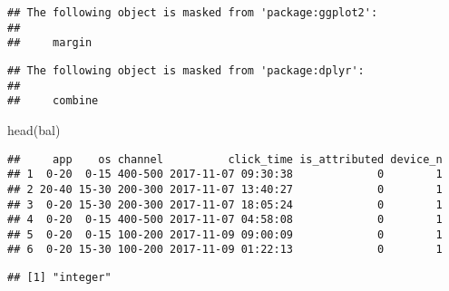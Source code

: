 \documentclass[
]{article}
\newenvironment{Shaded}{\begin{snugshade}}{\end{snugshade}}
\newcommand{\FunctionTok}[1]{\textcolor[rgb]{0.00,0.00,0.00}{#1}}
\newcommand{\NormalTok}[1]{#1}
\newcommand{\SpecialCharTok}[1]{\textcolor[rgb]{0.00,0.00,0.00}{#1}}
\begin{document}
\begin{verbatim}
## The following object is masked from 'package:ggplot2':
## 
##     margin
\end{verbatim}

\begin{verbatim}
## The following object is masked from 'package:dplyr':
## 
##     combine
\end{verbatim}

\begin{Shaded}
\begin{Highlighting}[]
\FunctionTok{head}\NormalTok{(bal)}
\end{Highlighting}
\end{Shaded}

\begin{verbatim}
##     app    os channel          click_time is_attributed device_n
## 1  0-20  0-15 400-500 2017-11-07 09:30:38             0        1
## 2 20-40 15-30 200-300 2017-11-07 13:40:27             0        1
## 3  0-20 15-30 200-300 2017-11-07 18:05:24             0        1
## 4  0-20  0-15 400-500 2017-11-07 04:58:08             0        1
## 5  0-20  0-15 100-200 2017-11-09 09:00:09             0        1
## 6  0-20 15-30 100-200 2017-11-09 01:22:13             0        1
\end{verbatim}

\begin{Shaded}
\end{Shaded}

\begin{verbatim}
## [1] "integer"
\end{verbatim}
\end{document}
